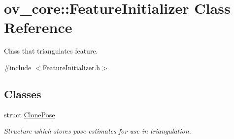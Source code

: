 \hypertarget{classov__core_1_1FeatureInitializer}{}\section{ov\+\_\+core\+:\+:Feature\+Initializer Class Reference}
\label{classov__core_1_1FeatureInitializer}


Class that triangulates feature.  




{\ttfamily \#include $<$Feature\+Initializer.\+h$>$}

\subsection*{Classes}
\begin{DoxyCompactItemize}
\item 
struct \hyperlink{structov__core_1_1FeatureInitializer_1_1ClonePose}{Clone\+Pose}
\begin{DoxyCompactList}\small\item\em Structure which stores pose estimates for use in triangulation. \end{DoxyCompactList}\end{DoxyCompactItemize}
